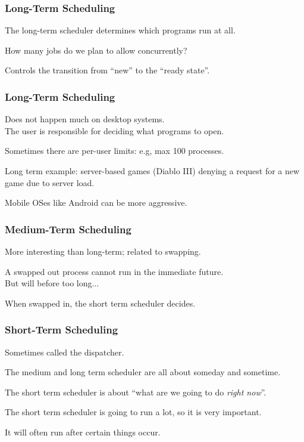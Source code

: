 \begin{frame}
\frametitle{Long-Term Scheduling}

The long-term scheduler determines which programs run at all.

How many jobs do we plan to allow concurrently?

Controls the transition from ``new'' to the ``ready state''.


\end{frame}

\begin{frame}
\frametitle{Long-Term Scheduling}
Does not happen much on desktop systems.\\
\quad The user is responsible for deciding what programs to open.

Sometimes there are per-user limits: e.g, max 100 processes.

Long term example: server-based games (Diablo III) denying a request for a new game due to server load.

Mobile OSes like Android can be more aggressive.


\end{frame}

\begin{frame}
\frametitle{Medium-Term Scheduling}

More interesting than long-term; related to swapping.

A swapped out process cannot run in the immediate future.\\
\quad But will before too long...

When swapped in, the short term scheduler decides.

\end{frame}

\begin{frame}
\frametitle{Short-Term Scheduling}
Sometimes called the \alert{dispatcher}. 

The medium and long term scheduler are all about someday and sometime. 

The short term scheduler is about ``what are we going to do \textit{right now}''. 

The short term scheduler is going to run a lot, so it is very important. 

It will often run after certain things occur. 


\end{frame}

